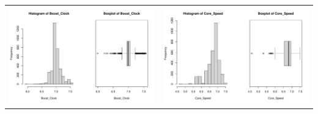 \documentclass[a4paper]{article}
\theoremstyle{definition}
\begin{document}
\begin{center}
\begin{adjustbox}{width=\textwidth}
    \begin{tabular}{cc}
        \includegraphics[keepaspectratio, width=1\textwidth, height=1\textheight]{Visualization/Rplot_11.pdf}
        &\includegraphics[keepaspectratio, width=1\textwidth, height=1\textheight]{Visualization/Rplot_12.pdf}\\
    \end{tabular}
\end{adjustbox}
\end{center}
\end{document}
